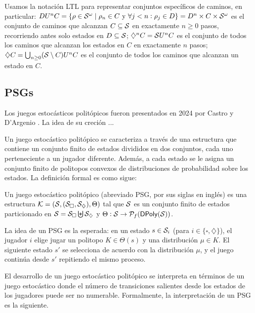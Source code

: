 Usamos la notación LTL para representar conjuntos específicos de caminos, en
particular: \( D U^n C = \{ \rho \in \mathcal{S}^\omega \mid \rho_n \in C \text{ y }
\forall j < n : \rho_j \in D \} = D^n \times C \times \mathcal{S}^\omega \) es el
conjunto de caminos que alcanzan \( C \subseteq \mathcal{S} \) en exactamente \( n \geq
0 \) pasos, recorriendo antes solo estados en \( D \subseteq \mathcal{S} \); \(
\diamondsuit^n C = \mathcal{S} U^n C \) es el conjunto de todos los caminos que
alcanzan los estados en \( C \) en exactamente \( n \) pasos; \( \diamondsuit C
= \bigcup_{n \geq 0} (\mathcal{S} \setminus C) U^n C \) es el conjunto de todos los
caminos que alcanzan un estado en \( C \).

\subsection{PSGs}

Los juegos estocásticos politópicos fueron presentados en 2024 por Castro y
D'Argenio \cite{Polytopal}. La idea de su creción ...

Un juego estocástico politópico se caracteriza a través de una estructura que
contiene un conjunto finito de estados divididos en dos conjuntos, cada uno
perteneciente a un jugador diferente. Además, a cada estado se le asigna un
conjunto finito de politopos convexos de distribuciones de probabilidad sobre
los estados. La definición formal es como sigue:

\begin{definition}[PSG]
	Un juego estocástico politópico (abreviado PSG, por sus siglas en inglés) es una estructura \( \mathcal{K} = (\mathcal{S}, (\mathcal{S}_\square, \mathcal{S}_\diamondsuit), \Theta) \) tal que \( \mathcal{S} \) es un conjunto finito de estados particionado en \( \mathcal{S} = \mathcal{S}_\square \biguplus \mathcal{S}_\diamondsuit \) y \( \Theta : \mathcal{S} \to \mathcal{P}_f(\textsf{DPoly}(\mathcal{S})) \).
\end{definition}

La idea de un PSG es la esperada: en un estado \( s \in \mathcal{S}_i \) (para \( i \in
\{ \square, \diamondsuit \} \)), el jugador \( i \) elige jugar un politopo \(
K \in \Theta(s) \) y una distribución \( \mu \in K \). El siguiente estado \(
s' \) se selecciona de acuerdo con la distribución \( \mu \), y el juego
continúa desde \( s' \) repitiendo el mismo proceso.

El desarrollo de un juego estocástico politópico se interpreta en términos de
un juego estocástico donde el número de transiciones salientes desde los
estados de los jugadores puede ser no numerable. Formalmente, la interpretación
de un PSG es la siguiente.

